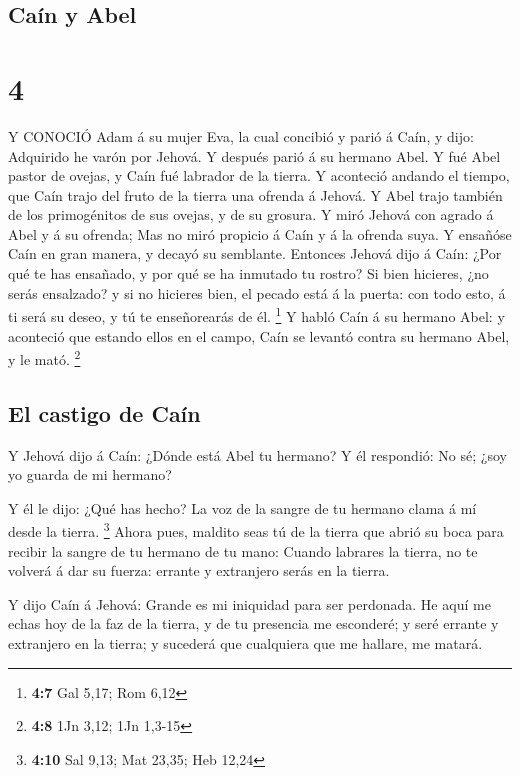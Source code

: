 \hypertarget{cauxedn-y-abel}{%
\subsection{Caín y Abel}\label{cauxedn-y-abel}}

\hypertarget{section-3}{%
\section{4}\label{section-3}}

 Y CONOCIÓ Adam á su mujer Eva, la cual concibió y parió á
Caín, y dijo: Adquirido he varón por Jehová.  Y después
parió á su hermano Abel. Y fué Abel pastor de ovejas, y Caín fué
labrador de la tierra.  Y aconteció andando el tiempo, que
Caín trajo del fruto de la tierra una ofrenda á Jehová.  Y
Abel trajo también de los primogénitos de sus ovejas, y de su grosura. Y
miró Jehová con agrado á Abel y á su ofrenda;  Mas no miró
propicio á Caín y á la ofrenda suya. Y ensañóse Caín en gran manera, y
decayó su semblante.  Entonces Jehová dijo á Caín: ¿Por qué
te has ensañado, y por qué se ha inmutado tu rostro?  Si
bien hicieres, ¿no serás ensalzado? y si no hicieres bien, el pecado
está á la puerta: con todo esto, á ti será su deseo, y tú te
enseñorearás de él. \footnote{\textbf{4:7} Gal 5,17; Rom 6,12}
 Y habló Caín á su hermano Abel: y aconteció que estando
ellos en el campo, Caín se levantó contra su hermano Abel, y le mató.
\footnote{\textbf{4:8} 1Jn 3,12; 1Jn 1,3-15}

\hypertarget{el-castigo-de-cauxedn}{%
\subsection{El castigo de Caín}\label{el-castigo-de-cauxedn}}

 Y Jehová dijo á Caín: ¿Dónde está Abel tu hermano? Y él
respondió: No sé; ¿soy yo guarda de mi hermano?

 Y él le dijo: ¿Qué has hecho? La voz de la sangre de tu
hermano clama á mí desde la tierra. \footnote{\textbf{4:10} Sal 9,13;
  Mat 23,35; Heb 12,24}  Ahora pues, maldito seas tú de la
tierra que abrió su boca para recibir la sangre de tu hermano de tu
mano:  Cuando labrares la tierra, no te volverá á dar su
fuerza: errante y extranjero serás en la tierra.

 Y dijo Caín á Jehová: Grande es mi iniquidad para ser
perdonada.  He aquí me echas hoy de la faz de la tierra, y
de tu presencia me esconderé; y seré errante y extranjero en la tierra;
y sucederá que cualquiera que me hallare, me matará.

